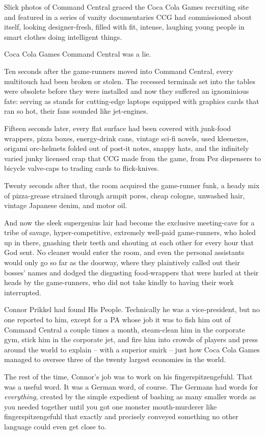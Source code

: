 Slick photos of Command Central graced the Coca Cola Games
recruiting site and featured in a series of vanity documentaries
CCG had commissioned about itself, looking designer-fresh, filled
with fit, intense, laughing young people in smart clothes doing
intelligent things.

Coca Cola Games Command Central was a lie.

Ten seconds after the game-runners moved into Command Central,
every multitouch had been broken or stolen. The recessed terminals
set into the tables were obsolete before they were installed and
now they suffered an ignominious fate: serving as stands for
cutting-edge laptops equipped with graphics cards that ran so hot,
their fans sounded like jet-engines.

Fifteen seconds later, every flat surface had been covered with
junk-food wrappers, pizza boxes, energy-drink cans, vintage sci-fi
novels, used kleenexes, origami orc-helmets folded out of post-it
notes, snappy hats, and the infinitely varied junky licensed crap
that CCG made from the game, from Pez dispensers to bicycle
valve-caps to trading cards to flick-knives.

Twenty seconds after that, the room acquired the game-runner funk,
a heady mix of pizza-grease strained through armpit pores, cheap
cologne, unwashed hair, vintage Japanese denim, and motor oil.

And now the sleek supergenius lair had become the exclusive
meeting-cave for a tribe of savage, hyper-competitive, extremely
well-paid game-runners, who holed up in there, gnashing their teeth
and shouting at each other for every hour that God sent. No cleaner
would enter the room, and even the personal assistants would only
go so far as the doorway, where they plaintively called out their
bosses' names and dodged the disgusting food-wrappers that were
hurled at their heads by the game-runners, who did not take kindly
to having their work interrupted.

Connor Prikkel had found His People. Technically he was a
vice-president, but no one reported to him, except for a PA whose
job it was to fish him out of Command Central a couple times a
month, steam-clean him in the corporate gym, stick him in the
corporate jet, and fire him into crowds of players and press around
the world to explain -- with a superior smirk -- just how Coca Cola
Games managed to oversee three of the twenty largest economies in
the world.

The rest of the time, Connor's job was to work on his
fingerspitzengefuhl. That was a useful word. It was a German word,
of course. The Germans had words for \emph{everything}, created by
the simple expedient of bashing as many smaller words as you needed
together until you got one monster mouth-murderer like
fingerspitzengefuhl that exactly and precisely conveyed something
no other language could even get close to.

